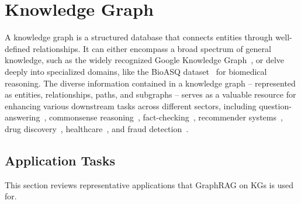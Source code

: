 
\section{Knowledge Graph \texorpdfstring{\emojikgtitle}{Knowledge Graph}}
\label{sec-kg}
A knowledge graph is a structured database that connects entities through well-defined relationships. It can either encompass a broad spectrum of general knowledge, such as the widely recognized Google Knowledge Graph~\cite{chen2020review, liu2020k}, or delve deeply into specialized domains, like the BioASQ dataset~\cite{tsatsaronis2015overview} for biomedical reasoning. The diverse information contained in a knowledge graph -- represented as entities, relationships, paths, and subgraphs -- serves as a valuable resource for enhancing various downstream tasks across different sectors, including question-answering~\cite{tian2024graph, wang2024knowledge, yasunaga2022deep}, commonsense reasoning~\cite{ilievski2021cskg}, fact-checking~\cite{kim2023factkg}, recommender systems~\cite{guo2020survey}, drug discovery~\cite{bonner2022review}, healthcare~\cite{chandak2023building}, and fraud detection~\cite{mao2022financial}.




\subsection{Application Tasks}
This section reviews representative applications that GraphRAG on KGs is used for.

